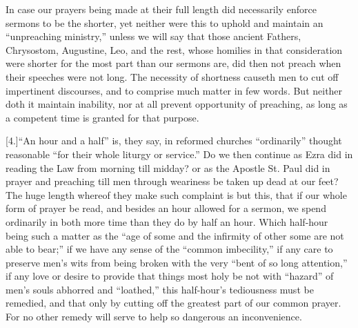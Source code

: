 In case our prayers being made at their full length did necessarily enforce sermons to be the shorter, yet neither were this to uphold and maintain an “unpreaching ministry,” unless we will say that those ancient Fathers, Chrysostom, Augustine, Leo, and the rest, whose homilies in that consideration were shorter for the most part than our sermons are, did then not preach when their speeches were not long. The necessity of shortness causeth men to cut off impertinent discourses, and to comprise much matter in few words. But neither doth it maintain inability, nor at all prevent opportunity of preaching, as long as a competent time is granted for that purpose.

[4.]“An hour and a half” is, they say, in reformed churches “ordinarily” thought reasonable “for their whole liturgy or service.” Do we then continue as Ezra did in reading the Law from morning till midday? or as the Apostle St. Paul did in prayer and preaching till men through weariness be taken up dead at our feet? The huge length whereof they make such complaint is but this, that if our whole form of prayer be read, and besides an hour allowed for a sermon, we spend ordinarily in both more time than they do by half an hour. Which half-hour being such a  matter as the “age of some and the infirmity of other some are not able to bear;”
 if we have any sense of the “common imbecility,” if any care to preserve men’s wits from being broken with the very “bent of so long attention,” if any love or desire to provide that things most holy be not with “hazard” of men’s souls abhorred and “loathed,” this half-hour’s tediousness must be remedied, and that only by cutting off the greatest part of our common prayer. For no other remedy will serve to help so dangerous an inconvenience.


